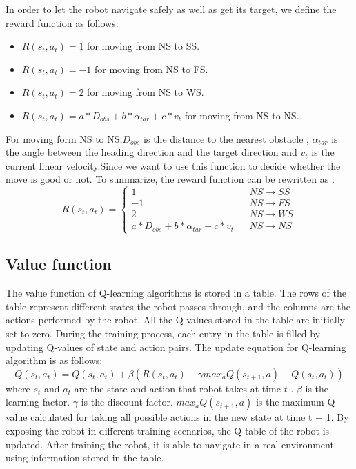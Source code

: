 \documentclass{acmtog} %
\begin{document}
	In order to let the robot navigate safely as well as get its target, we define the reward function as follows:
	\begin{itemize}
		\item $R(s_t,a_t) = 1$ for moving from NS to SS.
		\item $R(s_t,a_t) = -1$ for moving from NS to FS.
		\item $R(s_t,a_t) = 2$ for moving from NS to WS.
		\item $R(s_t,a_t) = a*D_{obs} + b * \alpha_{tar} + c* v_t$ for moving from NS to NS.
	\end{itemize}
	For moving form NS to NS,$D_{obs}$ is the distance to the nearest obstacle , $\alpha_{tar}$ is the angle  between the heading direction and the target direction and $v_t$ is the current linear velocity.Since we want to use this function to decide whether the move is good or not.
	To summarize, the reward function can be rewritten as :
	\begin{equation}
	R(s_t,a_t)=\left\{
	\begin{array}{rcl}
	1 & & {NS \rightarrow SS}\\
	-1 & & {NS \rightarrow FS}\\
	2 & & {NS \rightarrow WS}\\
	a*D_{obs} + b * \alpha_{tar} + c* v_t & & {NS \rightarrow NS}
	\end{array} \right.
	\end{equation}
	
	\subsection{Value function}
	The value function of Q-learning algorithms is stored in a table. The rows of the table represent
	different states the robot passes through, and the columns are the actions performed by the robot. All
	the Q-values stored in the table are initially set to zero. During the training process, each entry in
	the table is filled by updating Q-values of state and action pairs. The update equation for Q-learning
	algorithm is as follows:$$Q(s_t,a_t) = Q(s_t,a_t) + \beta(R(s_t,a_t) + \gamma max_a Q(s_{t+1},a) - Q(s_t,a_t))$$
	where $s_t$ and $a_t$ are the state and action that robot takes at time $t$ . $\beta$ is the learning factor. $\gamma$ is the	discount factor. $max_a Q(s_{t+1},a)$ is the maximum Q-value calculated for taking all possible actions in
	the new state at time t + 1. By exposing the robot in different training scenarios, the Q-table of the
	robot is updated. After training the robot, it is able to navigate in a real environment using information
	stored in the table.
	
\end{document}
